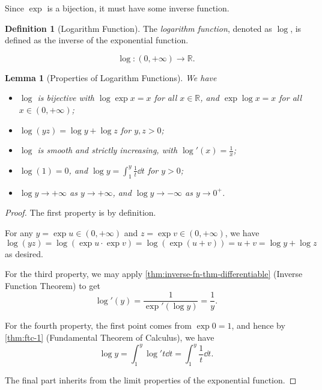 \documentclass[11pt]{article}
\numberwithin{equation}{section}
\newtheorem{lemma}[theorem]{Lemma}
\theoremstyle{definition}
\newtheorem{definition}[theorem]{Definition}
\theoremstyle{remark}
\newcommand{\pqty}[1]{\left(#1\right)}
\newcommand{\oointv}[2]{(#1,#2)}
\newcommand{\functiondomain}[3]{#1:#2\to #3}
\newcommand{\RR}{\mathbb R}
\newcommand{\plusinfty}{+\infty}
\newcommand{\minusinfty}{-\infty}
\begin{document}
Since \(\exp\) is a bijection, it must have some inverse function.

\begin{definition}[Logarithm Function]\label{analysis-unit-0221}
    \label{def:log}%
    The \emph{logarithm function}, denoted as \(\log\), is defined as the inverse of the exponential function.

    \[
        \functiondomain{\log}{\oointv{0}{\plusinfty}}{\RR}.
    \]
\end{definition}

\begin{lemma}[Properties of Logarithm Functions]\label{analysis-unit-0222}
    \label{lem:properties-log}%
    We have
    \begin{itemize}
        \item \(\log\) is bijective with \(\log \exp x = x\) for all \(x \in \RR\), and \(\exp \log x = x\) for all \(x \in \oointv{0}{\plusinfty}\);
        \item \(\log(yz)=\log y+\log z\) for \(y,z>0\);
        \item \(\log\) is smooth and strictly increasing, with \(\log' \pqty{x} = \frac{1}{x}\);
        \item \(\log\pqty{1} = 0\), and \(\log y = \int_1^y \frac{1}{t} \dd{t}\) for \(y>0\);
        \item \(\log y \to \plusinfty\) as \(y \to \plusinfty\), and \(\log y \to \minusinfty\) as \(y \to 0^+\).
    \end{itemize}
\end{lemma}

\begin{proof}
    The first property is by definition.

    For any \(y = \exp u \in \oointv{0}{\plusinfty}\) and \(z = \exp v \in \oointv{0}{\plusinfty}\), we have
    \[
        \log \pqty{yz} = \log \pqty{\exp u \cdot \exp v} = \log \pqty{\exp \pqty{u + v}} = u + v = \log y + \log z
    \]
    as desired.

    For the third property, we may apply \autoref{thm:inverse-fn-thm-differentiable} (Inverse Function Theorem) to get
    \[
        \log'\pqty{y} = \frac{1}{\exp'\pqty{\log y}} = \frac{1}{y}.
    \]

    For the fourth property, the first point comes from \(\exp 0 = 1\), and hence by \autoref{thm:ftc-1} (Fundamental Theorem of Calculus), we have
    \[
        \log y = \int_1^y \log' t \dd{t} = \int_1^y \frac{1}{t} \dd{t}.
    \]

    The final part inherits from the limit properties of the exponential function.
\end{proof}
\end{document}
